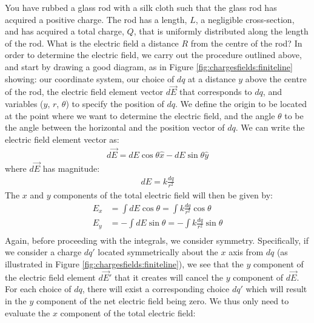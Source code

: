 \begin{example}{\label{ex:chargesfields:finiteline}You have rubbed a glass rod with a silk cloth such that the glass rod has acquired a positive charge. The rod has a length, $L$, a negligible cross-section, and has acquired a total charge, $Q$, that is uniformly distributed along the length of the rod. What is the electric field a distance $R$ from the centre of the rod?}
In order to determine the electric field, we carry out the procedure outlined above, and start by drawing a good diagram, as in Figure \ref{fig:chargesfields:finiteline} showing: our coordinate system, our choice of $dq$ at a distance $y$ above the centre of the rod, the electric field element vector $d\vec E$ that corresponds to $dq$, and variables ($y$, $r$, $\theta$) to specify the position of $dq$.
We define the origin to be located at the point where we want to determine the electric field, and the angle $\theta$ to be the angle between the horizontal and the position vector of $dq$. We can write the electric field element vector as:
\begin{align*}
d\vec E = dE\cos\theta \hat x - dE\sin\theta \hat y
\end{align*}
where $d\vec E$ has magnitude:
\begin{align*}
dE = k\frac{dq}{r^2}
\end{align*}
The $x$ and $y$ components of the total electric field will then be given by:
\begin{align*}
E_x &= \int dE\cos\theta=\int k\frac{dq}{r^2}\cos\theta \\
E_y &= -\int dE\sin\theta=-\int k\frac{dq}{r^2}\sin\theta\\
\end{align*}
Again, before proceeding with the integrals, we consider symmetry. Specifically, if we consider a charge $dq'$ located symmetrically about the $x$ axis from $dq$ (as illustrated in Figure \ref{fig:chargesfields:finiteline}), we see that the $y$ component of the electric field element $d\vec E'$ that it creates will cancel the $y$ component of $d\vec E$. For each choice of $dq$, there will exist a corresponding choice $dq'$ which will result in the $y$ component of the net electric field being zero. We thus only need to evaluate the $x$ component of the total electric field:
\begin{align*}

\end{align*}
\end{example}
